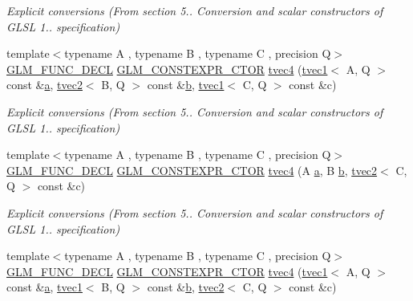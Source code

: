 \begin{DoxyCompactItemize}
\begin{DoxyCompactList}\small\item\em Explicit conversions (From section 5.. Conversion and scalar constructors of G\+L\+SL 1.. specification) \end{DoxyCompactList}\item 
{\footnotesize template$<$typename A , typename B , typename C , precision Q$>$ }\\\mbox{\hyperlink{setup_8hpp_ab2d052de21a70539923e9bcbf6e83a51}{G\+L\+M\+\_\+\+F\+U\+N\+C\+\_\+\+D\+E\+CL}} \mbox{\hyperlink{setup_8hpp_ad34178a09666081abdb573c14d1f4a5a}{G\+L\+M\+\_\+\+C\+O\+N\+S\+T\+E\+X\+P\+R\+\_\+\+C\+T\+OR}} \mbox{\hyperlink{structglm_1_1tvec4_a7eca60159dda77cc975ad39b0e2cf5dc}{tvec4}} (\mbox{\hyperlink{structglm_1_1tvec1}{tvec1}}$<$ A, Q $>$ const \&\mbox{\hyperlink{glad_8h_ac8729153468b5dcf13f971b21d84d4e5}{a}}, \mbox{\hyperlink{structglm_1_1tvec2}{tvec2}}$<$ B, Q $>$ const \&\mbox{\hyperlink{glad_8h_a6eba317e3cf44d6d26c04a5a8f197dcb}{b}}, \mbox{\hyperlink{structglm_1_1tvec1}{tvec1}}$<$ C, Q $>$ const \&c)
\begin{DoxyCompactList}\small\item\em Explicit conversions (From section 5.. Conversion and scalar constructors of G\+L\+SL 1.. specification) \end{DoxyCompactList}\item 
{\footnotesize template$<$typename A , typename B , typename C , precision Q$>$ }\\\mbox{\hyperlink{setup_8hpp_ab2d052de21a70539923e9bcbf6e83a51}{G\+L\+M\+\_\+\+F\+U\+N\+C\+\_\+\+D\+E\+CL}} \mbox{\hyperlink{setup_8hpp_ad34178a09666081abdb573c14d1f4a5a}{G\+L\+M\+\_\+\+C\+O\+N\+S\+T\+E\+X\+P\+R\+\_\+\+C\+T\+OR}} \mbox{\hyperlink{structglm_1_1tvec4_a54ad572a422fa13b5e17c2f0a0e85b86}{tvec4}} (A \mbox{\hyperlink{glad_8h_ac8729153468b5dcf13f971b21d84d4e5}{a}}, B \mbox{\hyperlink{glad_8h_a6eba317e3cf44d6d26c04a5a8f197dcb}{b}}, \mbox{\hyperlink{structglm_1_1tvec2}{tvec2}}$<$ C, Q $>$ const \&c)
\begin{DoxyCompactList}\small\item\em Explicit conversions (From section 5.. Conversion and scalar constructors of G\+L\+SL 1.. specification) \end{DoxyCompactList}\item 
{\footnotesize template$<$typename A , typename B , typename C , precision Q$>$ }\\\mbox{\hyperlink{setup_8hpp_ab2d052de21a70539923e9bcbf6e83a51}{G\+L\+M\+\_\+\+F\+U\+N\+C\+\_\+\+D\+E\+CL}} \mbox{\hyperlink{setup_8hpp_ad34178a09666081abdb573c14d1f4a5a}{G\+L\+M\+\_\+\+C\+O\+N\+S\+T\+E\+X\+P\+R\+\_\+\+C\+T\+OR}} \mbox{\hyperlink{structglm_1_1tvec4_a71e8bea6cf92f6f3f1b394959b46b9a9}{tvec4}} (\mbox{\hyperlink{structglm_1_1tvec1}{tvec1}}$<$ A, Q $>$ const \&\mbox{\hyperlink{glad_8h_ac8729153468b5dcf13f971b21d84d4e5}{a}}, \mbox{\hyperlink{structglm_1_1tvec1}{tvec1}}$<$ B, Q $>$ const \&\mbox{\hyperlink{glad_8h_a6eba317e3cf44d6d26c04a5a8f197dcb}{b}}, \mbox{\hyperlink{structglm_1_1tvec2}{tvec2}}$<$ C, Q $>$ const \&c)

\end{DoxyCompactItemize}
